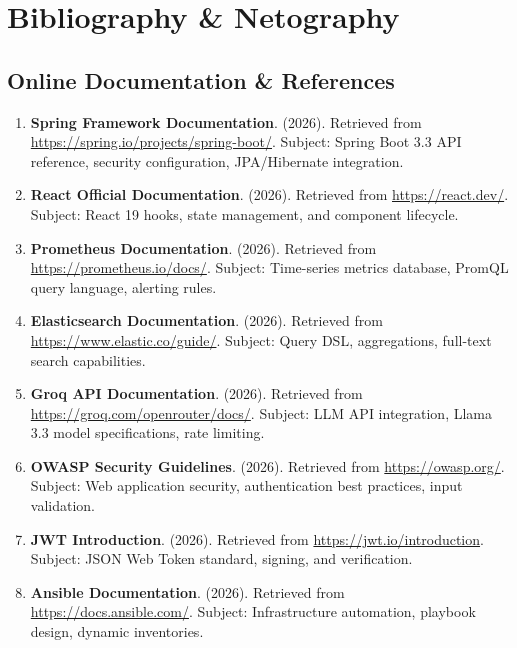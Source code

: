 \documentclass[12pt,a4paper]{report}
\begin{document}
\chapter*{Bibliography \& Netography}



\section*{Online Documentation \& References}

\begin{enumerate}
  \item \textbf{Spring Framework Documentation}. (2026). Retrieved from \url{https://spring.io/projects/spring-boot/}. Subject: Spring Boot 3.3 API reference, security configuration, JPA/Hibernate integration.
  
  \item \textbf{React Official Documentation}. (2026). Retrieved from \url{https://react.dev/}. Subject: React 19 hooks, state management, and component lifecycle.
  
  \item \textbf{Prometheus Documentation}. (2026). Retrieved from \url{https://prometheus.io/docs/}. Subject: Time-series metrics database, PromQL query language, alerting rules.
  
  \item \textbf{Elasticsearch Documentation}. (2026). Retrieved from \url{https://www.elastic.co/guide/}. Subject: Query DSL, aggregations, full-text search capabilities.
  
  \item \textbf{Groq API Documentation}. (2026). Retrieved from \url{https://groq.com/openrouter/docs/}. Subject: LLM API integration, Llama 3.3 model specifications, rate limiting.
  
  \item \textbf{OWASP Security Guidelines}. (2026). Retrieved from \url{https://owasp.org/}. Subject: Web application security, authentication best practices, input validation.
  
  \item \textbf{JWT Introduction}. (2026). Retrieved from \url{https://jwt.io/introduction}. Subject: JSON Web Token standard, signing, and verification.
  
  \item \textbf{Ansible Documentation}. (2026). Retrieved from \url{https://docs.ansible.com/}. Subject: Infrastructure automation, playbook design, dynamic inventories.
\end{enumerate}
\end{document}
